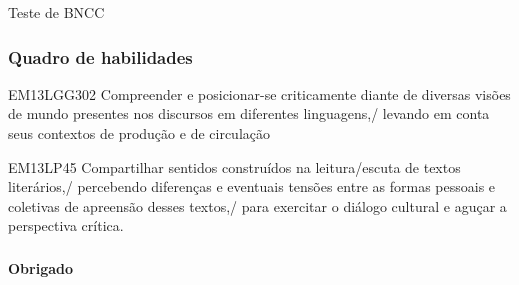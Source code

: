 \documentclass[smaller,professionalfonts]{beamer}
\begin{document}
\begin{frame}{Teste de BNCC}
\end{frame}

\begin{frame}
\frametitle{Quadro de habilidades}
\begin{block}{EM13LGG302}
Compreender e posicionar-se criticamente diante de diversas visões de mundo presentes nos discursos em diferentes linguagens,/ levando em conta seus contextos de produção e de circulação
\end{block}
\begin{block}{EM13LP45}
Compartilhar sentidos construídos na leitura/escuta de textos literários,/ percebendo diferenças e eventuais tensões entre as formas pessoais e coletivas de apreensão desses textos,/ para exercitar o diálogo cultural e aguçar a perspectiva crítica. 
\end{block}
\end{frame}

\begin{frame}
\frametitle{}
\centering\Large\textbf{Obrigado}
\end{frame}


\end{document}
